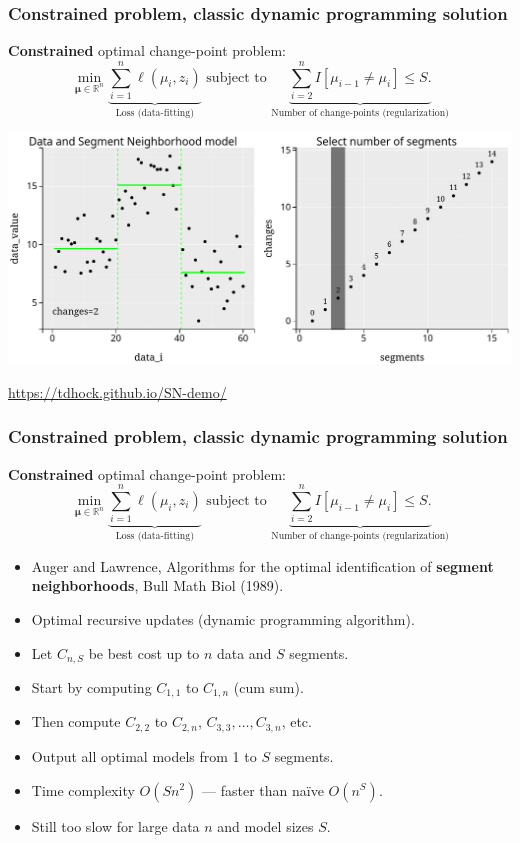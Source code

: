 \documentclass{beamer}
\newcommand{\RR}{\mathbb R}
\begin{document}
\begin{frame}
  \frametitle{Constrained problem, classic dynamic programming solution}
  \textbf{Constrained} optimal change-point problem:
$$
\min_{
  \mathbf \mu\in\RR^{n}
}
\underbrace{\sum_{i=1}^{n} \ell( \mu_i,  z_i)}_{\text{Loss (data-fitting)}}\text{ subject to }\underbrace{\sum_{i=2}^n I[\mu_{i-1}\neq \mu_i] \leq S.}_{\text{Number of change-points (regularization)}}
$$

\includegraphics[width=\textwidth]{SN-demo}

\url{https://tdhock.github.io/SN-demo/}

\end{frame}

\begin{frame}
  \frametitle{Constrained problem, classic dynamic programming solution}
  \textbf{Constrained} optimal change-point problem:
$$
\min_{
  \mathbf \mu\in\RR^{n}
}
\underbrace{\sum_{i=1}^{n} \ell( \mu_i,  z_i)}_{\text{Loss (data-fitting)}}\text{ subject to }\underbrace{\sum_{i=2}^n I[\mu_{i-1}\neq \mu_i] \leq S.}_{\text{Number of change-points (regularization)}}
$$
\begin{itemize}
\item Auger and Lawrence, Algorithms for the optimal identification of
  \textbf{segment neighborhoods}, Bull Math Biol (1989).
\item Optimal recursive updates (dynamic programming algorithm).
\item Let $C_{n,S}$ be best cost up to $n$ data and $S$ segments.
\item Start by computing $C_{1,1}$ to $C_{1,n}$ (cum sum).
\item Then compute $C_{2,2}$ to $C_{2,n}$, $C_{3,3},\dots,C_{3,n}$, etc.
\item Output all optimal models from 1 to $S$ segments.
\item Time complexity $O(S n^2)$ --- faster than naïve $O(n^S)$.
\item Still too slow for large data $n$ and model sizes $S$.
\end{itemize}
\end{frame}
\end{document}
